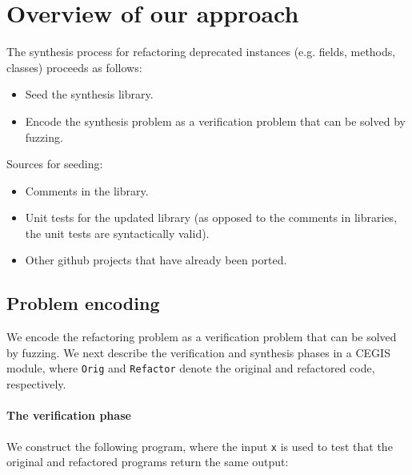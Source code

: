 \documentclass[runningheads,a4paper]{llncs}
\begin{document}
%



\section{Overview of our approach} \label{sec:approach}



The synthesis process for refactoring deprecated instances (e.g. fields, methods, classes) proceeds as follows:
\begin{itemize}
\item Seed the synthesis library.
\item Encode the synthesis problem as a verification problem that can be solved by fuzzing.
\end{itemize}
  
Sources for seeding:
\begin{itemize}
\item Comments in the library.
\item Unit tests for the updated library (as opposed to the comments in libraries,
  the unit tests are syntactically valid).
\item Other github projects that have already been ported.
\end{itemize}  


\subsection{Problem encoding}\label{sec:encoding}
We encode the refactoring problem as a verification problem that can be solved by
fuzzing. We next describe the verification and synthesis phases in a CEGIS module,
where \texttt{Orig} and \texttt{Refactor} denote the original and refactored code,
respectively.

\paragraph{The verification phase} We construct the following program, where the input
\texttt{x} is used to test that the original and refactored programs return
the same output:
\end{document}
